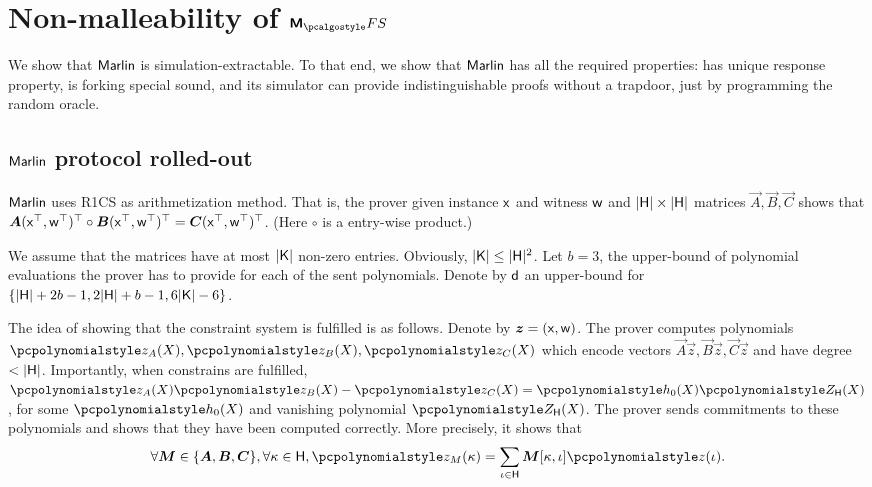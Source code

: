 
\section{Non-malleability of $\marlinprotfs$}
We show that ${\textnormal{\textsf{Marlin}}}$ is simulation-extractable. To that end, we show
that ${\textnormal{\textsf{Marlin}}}$ has all the required properties: has unique response property, is
forking special sound, and its simulator can provide indistinguishable proofs
without a trapdoor, just by programming the random oracle.

\subsection{${\textnormal{\textsf{Marlin}}}$ protocol rolled-out}
${\textnormal{\textsf{Marlin}}}$ uses R1CS as arithmetization method. That is, the prover given
instance $\mathsf{x}$ and witness $\mathsf{w}$ and $|\mathsf{H}| \times |\mathsf{H}|$ matrices $\vec{A},
\vec{B}, \vec{C}$ shows that $\vec{A} (\inp^\top, \wit^\top)^\top \circ \vec{B}
(\inp^\top, \wit^\top)^\top = \vec{C} (\inp^\top, \wit^\top)^\top$. (Here
$\circ$ is a entry-wise product.)

We assume that the matrices have at most $|\mathsf{K}|$ non-zero entries. Obviously,
$|\mathsf{K}| \leq |\mathsf{H}|^2$. Let $b = 3$, the upper-bound of polynomial evaluations
the prover has to provide for each of the sent polynomials.  Denote by $\mathsf{d}$
an upper-bound for $\{|\mathsf{H}| + 2b -1, 2 |\mathsf{H}| + b - 1, 6 |\mathsf{K}| - 6\}$.

The idea of showing that the constraint system is fulfilled is as
follows. Denote by $\vec{z} = (\inp, \wit)$. The prover computes polynomials
$\p{z_A} (X), \p{z_B} (X), \p{z_C} (X)$ which encode vectors
$\vec{A} \vec{z}, \vec{B} \vec{z}, \vec{C} \vec{z}$ and have degree $<
|\mathsf{H}|$. Importantly, when constrains are fulfilled,
$ \p{z_A} (X) \p{z_B} (X) - \p{z_C} (X) = \p{h_0} (X) \ZERO_\HHH (X)$, for some
$\p{h_0} (X)$ and vanishing polynomial $\ZERO_\HHH (X)$. The prover sends
commitments to these polynomials and shows that they have been computed
correctly. More precisely, it shows that
\begin{equation}
  \label{eq:marlin_eq_2}
\forall \vec{M} \in \smallset{\vec{A}, \vec{B}, \vec{C}},  \forall \kappa \in \HHH,
\p{z_M} (\kappa) = \sum_{\iota \in \HHH} \vec{M}[\kappa, \iota] \p{z}(\iota).
\end{equation}

